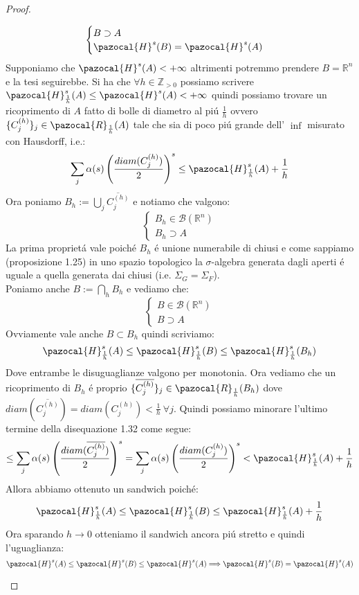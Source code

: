 \documentclass[11pt,a4paper]{report}
\theoremstyle{plain}
\theoremstyle{definition}
\newcommand{\Hu}{\pazocal{H}}
\newcommand{\B}{\mathcal{B}}
\begin{document}
\begin{proof}
\begin{enumerate}
		\[
			\begin{cases}
				B \supset A \\
				\Hu^s(B) = \Hu^s(A)
			\end{cases}		
		\]
		Supponiamo che $\Hu^s(A) < +\infty$ altrimenti potremmo prendere $B = \mathbb{R}^n$ e la tesi seguirebbe. Si ha che $\forall h \in \mathbb{Z}_{>0}$ possiamo scrivere $\Hu_{\frac{1}{h}}^s(A) \le \Hu^s(A) < +\infty$ quindi possiamo trovare un ricoprimento di $A$ fatto di bolle di diametro al pi\'u $\frac{1}{h}$ ovvero $\{C_j^{(h)}\}_j \in \pazocal{R}_{\frac{1}{h}}(A)$ tale che sia di poco pi\'u grande dell' $\inf$ misurato con Hausdorff, i.e.:
		\[
			\sum\limits_j \alpha(s) \left(\frac{diam(C_j^{(h)})}{2}\right)^s	\le \Hu_{\frac{1}{h}}^s(A) + \frac{1}{h}
		\]
		Ora poniamo $B_h := \bigcup\limits_j\overline{C_j^{(h)}}$ e notiamo che valgono:
		\[
			\begin{cases}
				B_h \in \B(\mathbb{R}^n) \\
				B_h \supset A
			\end{cases}		
		\]
		La prima propriet\'a vale poich\'e $B_h$ \'e unione numerabile di chiusi e come sappiamo (proposizione 1.25) in uno spazio topologico la $\sigma$-algebra generata dagli aperti \'e uguale a quella generata dai chiusi (i.e. $\Sigma_G = \Sigma_F$).\\
		Poniamo anche $B := \bigcap\limits_hB_h$ e vediamo che:
		\[
			\begin{cases}
				B \in \B(\mathbb{R}^n)\\
				B \supset A
			\end{cases}		
		\]
		Ovviamente vale anche $B \subset B_h$ quindi scriviamo:
		\begin{equation}
			\Hu_{\frac{1}{h}}^s(A) \le \Hu_{\frac{1}{h}}^s(B) \le \Hu_{\frac{1}{h}}^s(B_h)
		\end{equation}
		Dove entrambe le disuguaglianze valgono per monotonia. Ora vediamo che un ricoprimento di $B_h$ \'e proprio $\{\overline{C_j^{(h)}}\}_j \in \pazocal{R}_{\frac{1}{h}}(B_h)$ dove $diam(\overline{C_j^{(h)}}) = diam(C_j^{(h)}) < \frac{1}{h}\ \forall j$. Quindi possiamo minorare l'ultimo termine della disequazione 1.32 come segue:
		\[
			\le \sum\limits_j \alpha(s) \left(\frac{diam(\overline{C_j^{(h)}})}{2}\right)^s = \sum\limits_j \alpha(s) \left(\frac{diam(C_j^{(h)})}{2}\right)^s < \Hu_{\frac{1}{h}}^s(A) + \frac{1}{h}
		\]
		Allora abbiamo ottenuto un sandwich poich\'e:
		\[
			\Hu_{\frac{1}{h}}^s(A) \le \Hu_{\frac{1}{h}}^s(B) \le \Hu_{\frac{1}{h}}^s(A) + \frac{1}{h}	
		\]
		Ora sparando $h \rightarrow 0$ otteniamo il sandwich ancora pi\'u stretto e quindi l'uguaglianza:
		\[
			\Hu^s(A) \le \Hu^s(B) \le \Hu^s(A) \Longrightarrow \Hu^s(B) = \Hu^s(A)
		\]
	\end{enumerate}
\end{proof}
\end{document}
